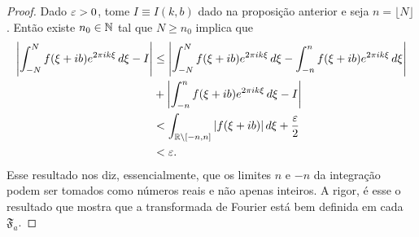        \begin{proof}
            Dado $\varepsilon>0$, tome $I\equiv I(k,b)$ dado na proposição anterior e seja $n = \lfloor N \rfloor$. 
            Então existe $n_0\in\mathbb{N}$ tal que $N\geq n_0$ implica que
            \begin{align*}
                \left| \int_{-N}^N f(\xi + ib)e^{2\pi ik\xi} \, d\xi - I \right| 
                &\leq \left| \int_{-N}^N f(\xi + ib)e^{2\pi ik\xi} \, d\xi 
                - \int_{-n}^n f(\xi + ib)e^{2\pi ik\xi} \, d\xi \right| \\
                &+ \left| \int_{-n}^n f(\xi + ib)e^{2\pi ik\xi} \, d\xi - I \right| \\
                &< \int_{\mathbb{R}\setminus[-n,n]} |f(\xi + ib)| \, d\xi + \frac{\varepsilon}{2} \\
                &< \varepsilon.
            \end{align*}
            Esse resultado nos diz, essencialmente, que os limites $n$ e $-n$ da integração podem
            ser tomados como números reais e não apenas inteiros. A rigor, é esse o resultado que mostra
            que a transformada de Fourier está bem definida em cada $\mathfrak{F}_a$.
        \end{proof}
